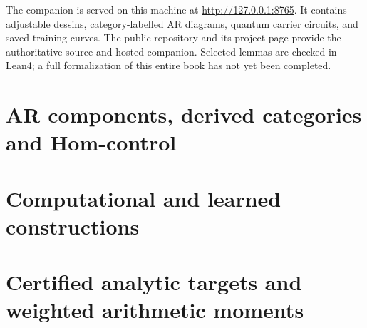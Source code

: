 \documentclass[11pt,oneside,openany]{book}
\theoremstyle{definition}\newtheorem{definition}[theorem]{Definition}
\theoremstyle{remark}\newtheorem{remark}[theorem]{Remark}
\begin{document}
The companion is served on this machine at \url{http://127.0.0.1:8765}. It contains adjustable dessins, category-labelled AR diagrams, quantum carrier circuits, and saved training curves. The public repository and its project page provide the authoritative source and hosted companion. Selected lemmas are checked in Lean4; a full formalization of this entire book has not yet been completed.
{\small\let\savedaddvspace\addvspace\renewcommand{\addvspace}[1]{\savedaddvspace{.6em}}\tableofcontents}
\mainmatter

\part{AR components, derived categories and Hom-control}






\part{Computational and learned constructions}








\part{Certified analytic targets and weighted arithmetic moments}



\backmatter

\end{document}
